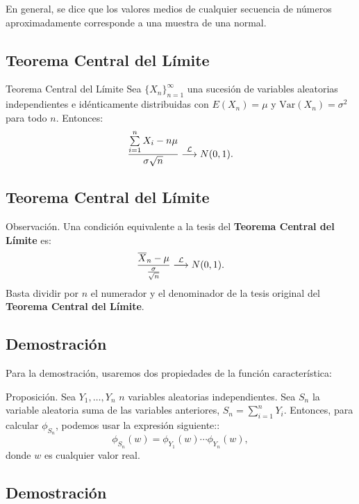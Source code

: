 \documentclass[]{book}
\begin{document}
En general, se dice que los valores medios de cualquier secuencia de números aproximadamente corresponde a una muestra de una normal.

\hypertarget{teorema-central-del-luxedmite-1}{%
\subsection{Teorema Central del Límite}\label{teorema-central-del-luxedmite-1}}

 Teorema Central del Límite
Sea \(\{X_n\}_{n=1}^\infty\) una sucesión de variables aleatorias independientes e idénticamente distribuidas con \(E(X_n)=\mu\) y \(\mathrm{Var}(X_n)=\sigma^2\) para todo \(n\). Entonces:
\[
\frac{\sum\limits_{i=1}^n X_i-n\mu}{\sigma\sqrt{n}}\stackrel{{\cal L}}{\longrightarrow} N(0,1).
\]

\hypertarget{teorema-central-del-luxedmite-2}{%
\subsection{Teorema Central del Límite}\label{teorema-central-del-luxedmite-2}}

 Observación.
Una condición equivalente a la tesis del \textbf{Teorema Central del Límite} es:
\[
\frac{\overline{X}_n-\mu}{\frac{\sigma}{\sqrt{n}}}\stackrel{{\cal L}}{\longrightarrow} N(0,1).
\]
Basta dividir por \(n\) el numerador y el denominador de la tesis original del \textbf{Teorema Central del Límite}.

\hypertarget{demostraciuxf3n-3}{%
\subsection{Demostración}\label{demostraciuxf3n-3}}

Para la demostración, usaremos dos propiedades de la función característica:

 Proposición.
Sea \(Y_1,\ldots, Y_n\) \(n\) variables aleatorias independientes. Sea \(S_n\) la variable aleatoria suma de las variables anteriores, \(S_n=\sum\limits_{i=1}^n Y_i\). Entonces, para calcular \(\phi_{S_n}\), podemos usar la expresión siguiente::
\[
\phi_{S_n}(w)=\phi_{Y_1}(w)\cdots \phi_{Y_n}(w),
\]
donde \(w\) es cualquier valor real.

\hypertarget{demostraciuxf3n-4}{%
\subsection{Demostración}\label{demostraciuxf3n-4}}
\end{document}
